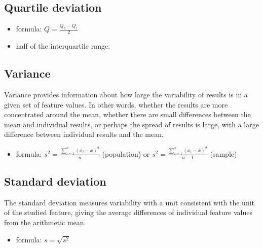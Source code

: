 \documentclass[
  english,
  letterpaper,
  DIV=11,
  numbers=noendperiod]{scrreprt}
\providecommand{\tightlist}{%
  \setlength{\itemsep}{0pt}\setlength{\parskip}{0pt}}
\begin{document}
\subsection{Quartile deviation}\label{quartile-deviation}

\begin{itemize}
\tightlist
\item
  formula: \(Q=\frac{Q_3-Q_1}{2}\)
\item
  half of the interquartile range.
\end{itemize}

\subsection{Variance}\label{variance}

Variance provides information about how large the variability of results
is in a given set of feature values. In other words, whether the results
are more concentrated around the mean, whether there are small
differences between the mean and individual results, or perhaps the
spread of results is large, with a large difference between individual
results and the mean.

\begin{itemize}
\tightlist
\item
  formula: \(s^2=\frac{\sum\limits_{i=1}^n (x_i-\overline{x})^2}{n}\)
  (population) or
  \(s^2=\frac{\sum\limits_{i=1}^n (x_i-\overline{x})^2}{n-1}\) (sample)
\end{itemize}

\subsection{Standard deviation}\label{standard-deviation}

The standard deviation measures variability with a unit consistent with
the unit of the studied feature, giving the average differences of
individual feature values from the arithmetic mean.

\begin{itemize}
\tightlist
\item
  formula: \(s=\sqrt{s^2}\)
\end{itemize}
\end{document}
